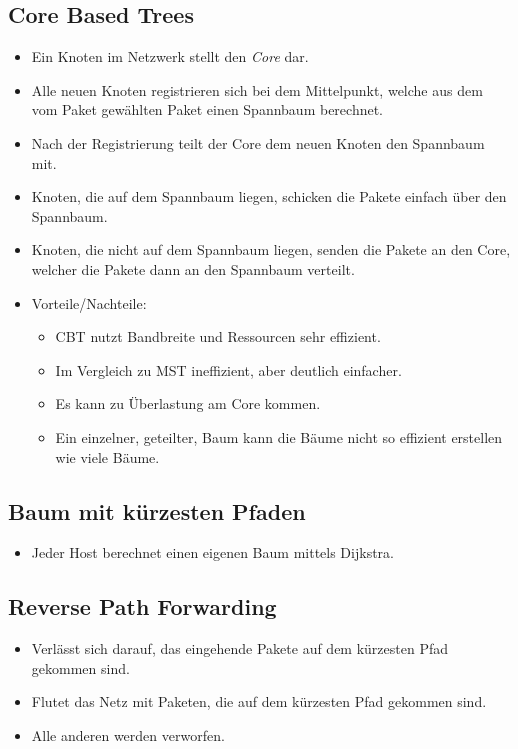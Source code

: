\documentclass[a4paper, 11pt, accentcolor = tud3b]{tudreport}
\begin{document}
            \subsection{Core Based Trees}
                \begin{itemize}
                	\item Ein Knoten im Netzwerk stellt den \textit{Core} dar.
                	\item Alle neuen Knoten registrieren sich bei dem Mittelpunkt, welche aus dem vom Paket gewählten Paket einen Spannbaum berechnet.
                	\item Nach der Registrierung teilt der Core dem neuen Knoten den Spannbaum mit.
                	\item Knoten, die auf dem Spannbaum liegen, schicken die Pakete einfach über den Spannbaum.
                	\item Knoten, die nicht auf dem Spannbaum liegen, senden die Pakete an den Core, welcher die Pakete dann an den Spannbaum verteilt.
                	\item Vorteile/Nachteile:
	                	\begin{itemize}
	                		\item CBT nutzt Bandbreite und Ressourcen sehr effizient.
	                		\item Im Vergleich zu MST ineffizient, aber deutlich einfacher.
	                		\item Es kann zu Überlastung am Core kommen.
	                		\item Ein einzelner, geteilter, Baum kann die Bäume nicht so effizient erstellen wie viele Bäume.
	                	\end{itemize}
                \end{itemize}

            \subsection{Baum mit kürzesten Pfaden}
                \begin{itemize}
                	\item Jeder Host berechnet einen eigenen Baum mittels Dijkstra.
                \end{itemize}

            \subsection{Reverse Path Forwarding}
                \begin{itemize}
                	\item Verlässt sich darauf, das eingehende Pakete auf dem kürzesten Pfad gekommen sind.
                	\item Flutet das Netz mit Paketen, die auf dem kürzesten Pfad gekommen sind.
                	\item Alle anderen werden verworfen.
                \end{itemize}
\end{document}
